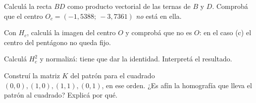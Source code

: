 \begin{ejercicio}
Calculá la recta \(BD\) como producto vectorial de las ternas de \(B\) y \(D\). Comprobá que el
centro \(O_c=(-1{,}5388;\ -3{,}7361)\) \emph{no} está en ella.
\end{ejercicio}

\begin{ejercicio}
Con \(H_c\), calculá la imagen del centro \(O\) y comprobá que no es \(O\): en el caso (c) el
centro del pentágono no queda fijo.
\end{ejercicio}

\begin{ejercicio}
Calculá \(H_c^2\) y normalizá: tiene que dar la identidad. Interpretá el resultado.
\end{ejercicio}

\begin{ejercicio}
Construí la matriz \(K\) del patrón para el cuadrado \((0,0),(1,0),(1,1),(0,1)\), en ese orden.
¿Es afín la homografía que lleva el patrón al cuadrado? Explicá por qué.
\end{ejercicio}


